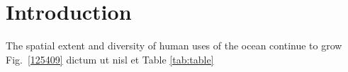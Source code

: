\section{Introduction}
\label{introduction}

The spatial extent and diversity of human uses of the ocean continue to grow Fig.~\ref{125409} dictum ut nisl et Table \ref{tab:table}
